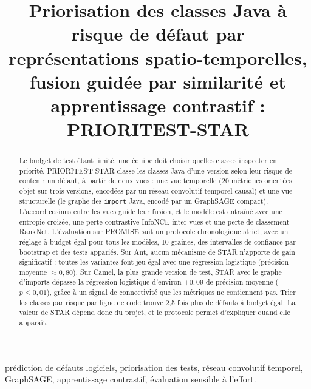 \documentclass[conference,a4paper]{IEEEtran}
\newcommand{\code}[1]{\texttt{#1}}
\begin{document}
\title{\textcolor{ieeeblue}{Priorisation des classes Java à risque de défaut par représentations spatio-temporelles,
fusion guidée par similarité et apprentissage contrastif : PRIORITEST-STAR}}

\author{
}

\maketitle

\begin{abstract}
Le budget de test étant limité, une équipe doit choisir quelles classes inspecter en priorité. PRIORITEST-STAR classe
les classes Java d'une version selon leur risque de contenir un défaut, à partir de deux vues : une vue temporelle
(20 métriques orientées objet sur trois versions, encodées par un réseau convolutif temporel causal) et une vue
structurelle (le graphe des \code{import} Java, encodé par un GraphSAGE compact). L'accord cosinus entre les vues
guide leur fusion, et le modèle est entraîné avec une entropie croisée, une perte contrastive InfoNCE inter-vues et une
perte de classement RankNet. L'évaluation sur PROMISE suit un protocole chronologique strict, avec un réglage à budget
égal pour tous les modèles, 10 graines, des intervalles de confiance par bootstrap et des tests appariés. Sur Ant, aucun
mécanisme de STAR n'apporte de gain significatif : toutes les variantes font jeu égal avec une régression logistique
(précision moyenne $\approx0{,}80$). Sur Camel, la plus grande version de test, STAR avec le graphe d'imports dépasse la
régression logistique d'environ $+0{,}09$ de précision moyenne ($p\le0{,}01$), grâce à un signal de connectivité que
les métriques ne contiennent pas. Trier les classes par risque par ligne de code trouve 2,5 fois plus de défauts à
budget égal. La valeur de STAR dépend donc du projet, et le protocole permet d'expliquer quand elle apparaît.
\end{abstract}

\begin{IEEEkeywords}
prédiction de défauts logiciels, priorisation des tests, réseau convolutif temporel, GraphSAGE, apprentissage
contrastif, évaluation sensible à l'effort.
\end{IEEEkeywords}
\end{document}
